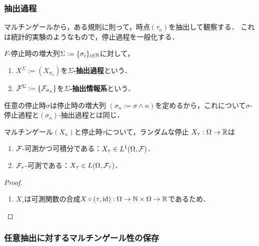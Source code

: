 \documentclass[uplatex,dvipdfmx]{jsreport}
\begin{document}
\subsubsection{抽出過程}

\begin{tcolorbox}[colframe=ForestGreen, colback=ForestGreen!10!white,breakable,colbacktitle=ForestGreen!40!white,coltitle=black,fonttitle=\bfseries\sffamily,
title=]
    マルチンゲールから，ある規則に則って，時点$(\tau_n)$を抽出して観察する．
    これは統計的実験のようなもので，停止過程を一般化する．
\end{tcolorbox}

\begin{definition}
    $F$-停止時の増大列$\Sigma:=\{\sigma_i\}_{i\in\mathbb{N}}$に対して，
    \begin{enumerate}
        \item $X^\Sigma:=(X_{\sigma_n})$を\textbf{$\Sigma$-抽出過程}という．
        \item $\mathcal{F}^\Sigma:=\{\mathcal{F}_{\sigma_n}\}$を\textbf{$\Sigma$-抽出情報系}という．
    \end{enumerate}
\end{definition}
\begin{example}[停止過程は抽出過程である]
    任意の停止時$\sigma$は停止時の増大列
    $(\sigma_n:=\sigma\land n)$を定めるから，これについて$\sigma$-停止過程と$(\sigma_n)$-抽出過程とは同じ．
\end{example}

\begin{lemma}
    マルチンゲール$(X_n)$と停止時$\tau$について，ランダムな停止
    $X_\tau:\Omega\to\mathbb{R}$は
    \begin{enumerate}
        \item $\mathcal{F}$-可測かつ可積分である：$X_\tau\in L^1(\Omega,\mathcal{F})$．
        \item $\mathcal{F}_\tau$-可測である：$X_\tau\in L(\Omega,\mathcal{F}_\tau)$．
    \end{enumerate}
\end{lemma}
\begin{proof}\mbox{}
    \begin{enumerate}
        \item $X_\tau$は可測関数の合成$X\circ (\tau,\mathrm{id}):\Omega\to\mathbb{N}\times\Omega\to\mathbb{R}$であるため．
    \end{enumerate}
\end{proof}

\subsubsection{任意抽出に対するマルチンゲール性の保存}
\end{document}
